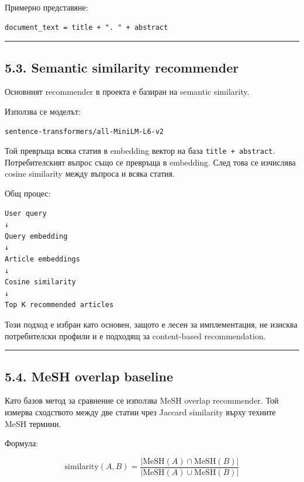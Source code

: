 \documentclass[12pt,a4paper]{article}
\begin{document}
Примерно представяне:

\begin{verbatim}
document_text = title + ". " + abstract
\end{verbatim}

\vspace{0.5em}\hrule\vspace{1.0em}

\subsection{5.3. Semantic similarity recommender}\label{semantic-similarity-recommender}

Основният recommender в проекта е базиран на semantic similarity.

Използва се моделът:

\begin{verbatim}
sentence-transformers/all-MiniLM-L6-v2
\end{verbatim}

Той превръща всяка статия в embedding вектор на база \texttt{title\ +\ abstract}. Потребителският въпрос също се превръща в embedding. След това се изчислява cosine similarity между въпроса и всяка статия.

Общ процес:

\begin{verbatim}
User query
↓
Query embedding
↓
Article embeddings
↓
Cosine similarity
↓
Top K recommended articles
\end{verbatim}

Този подход е избран като основен, защото е лесен за имплементация, не изисква потребителски профили и е подходящ за content-based recommendation.

\vspace{0.5em}\hrule\vspace{1.0em}

\subsection{5.4. MeSH overlap baseline}\label{mesh-overlap-baseline}

Като базов метод за сравнение се използва MeSH overlap recommender. Той измерва сходството между две статии чрез Jaccard similarity върху техните MeSH термини.

Формула:

\begin{equation*}
\mathrm{similarity}(A,B) = \frac{|\mathrm{MeSH}(A) \cap \mathrm{MeSH}(B)|}{|\mathrm{MeSH}(A) \cup \mathrm{MeSH}(B)|}
\end{equation*}
\end{document}
